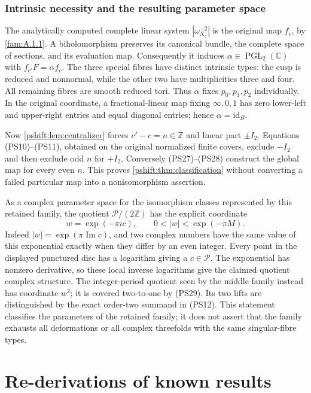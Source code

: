 \documentclass[11pt,a4paper]{article}
\theoremstyle{plain}
\theoremstyle{definition}
\begin{document}
\subsubsection{Intrinsic necessity and the resulting parameter space}

The analytically computed complete linear system
$|\omega_{X_c}^{-2}|$ is the original map $f_c$, by
\cref{fam:A.1.1}. A biholomorphism preserves its
canonical bundle, the complete space of sections, and its evaluation
map. Consequently it induces $\alpha\in\operatorname{PGL}_2(\mathbb C)$
with $f_{c'}F=\alpha f_c$. The three special fibres have distinct
intrinsic types: the cusp is reduced and nonnormal, while the other
two have multiplicities three and four. All remaining fibres are
smooth reduced tori. Thus $\alpha$ fixes $p_0,p_1,p_2$ individually.
In the original coordinate, a fractional-linear map fixing
$\infty,0,1$ has zero lower-left and upper-right entries and equal
diagonal entries; hence $\alpha=\mathrm{id}_B$.

Now \cref{pshift:lem:centralizer} forces $c'-c=n\in\mathbb Z$
and linear part $\pm I_2$. Equations (PS10)--(PS11), obtained on
the original normalized finite covers, exclude $-I_2$ and then
exclude odd $n$ for $+I_2$. Conversely (PS27)--(PS28) construct
the global map for every even $n$. This proves
\cref{pshift:thm:classification} without converting a failed
particular map into a nonisomorphism assertion.

As a complex parameter space for the isomorphism classes represented
by this retained family, the quotient $\mathcal P/(2\mathbb Z)$ has
the explicit coordinate
\[
 w=\exp(-\pi ic),\qquad 0<|w|<\exp(-\pi M).
 \tag{PS29}\label{pshift:eq:parameter-disc}
\]
Indeed $|w|=\exp(\pi\operatorname{Im}c)$, and two complex numbers
have the same value of this exponential exactly when they differ
by an even integer. Every point in the displayed punctured disc
has a logarithm giving a $c\in\mathcal P$. The exponential has
nonzero derivative, so these local inverse logarithms give the
claimed quotient complex structure. The integer-period quotient
seen by the middle family instead has coordinate $w^2$; it is
covered two-to-one by (PS29). Its two lifts are distinguished by
the exact order-two summand in (PS12). This statement classifies
the parameters of the retained family; it does not assert that
the family exhausts all deformations or all complex threefolds
with the same singular-fibre types.


\section{Re-derivations of known results}\label{app:known}
\end{document}
